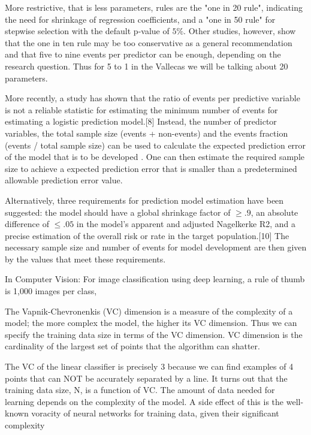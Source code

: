 \documentclass[preprint,12pt]{elsarticle}
\begin{document}
More restrictive, that is less parameters, rules are the "one in 20 rule", indicating the need for shrinkage of regression coefficients, and a "one in 50 rule" for stepwise selection with the default p-value of $5\%$.
Other studies, however, show that the one in ten rule may be too conservative as a general recommendation and that five to nine events per predictor can be enough, depending on the research question. Thus for 5 to 1 in the Vallecas we will be talking about 20 parameters.

More recently, a study has shown that the ratio of events per predictive variable is not a reliable statistic for estimating the minimum number of events for estimating a logistic prediction model.[8] Instead, the number of predictor variables, the total sample size (events + non-events) and the events fraction (events / total sample size) can be used to calculate the expected prediction error of the model that is to be developed \cite{van2018sample}. One can then estimate the required sample size to achieve a expected prediction error that is smaller than a predetermined allowable prediction error value.

Alternatively, three requirements for prediction model estimation have been suggested: the model should have a global shrinkage factor of $ \geq.9$, an absolute difference of $\leq .05$ in the model's apparent and adjusted Nagelkerke R2, and a precise estimation of the overall risk or rate in the target population.[10] The necessary sample size and number of events for model development are then given by the values that meet these requirements.

In Computer Vision: For image classification using deep learning, a rule of thumb is 1,000 images per class,


The Vapnik-Chevronenkis (VC) dimension is a measure of the complexity of a model; the more complex the model, the higher its VC dimension. Thus we can specify the training data size in terms of the VC dimension.
VC dimension is the cardinality of the largest set of points that the algorithm can shatter. 

The VC of the linear classifier is precisely 3 because we can find examples of 4 points that can NOT be accurately separated by a line. It turns out that the training data size, N, is a function of VC. The amount of data needed for learning depends on the complexity of the model. A side effect of this is the well-known voracity of neural networks for training data, given their significant complexity \cite{juba2019precision}
\end{document}
